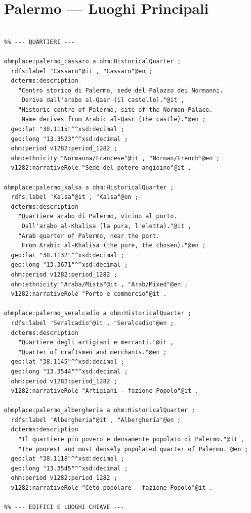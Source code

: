 \section{Palermo — Luoghi Principali}

\begin{verbatim}

%% --- QUARTIERI ---

ohmplace:palermo_cassaro a ohm:HistoricalQuarter ;
  rdfs:label "Cassaro"@it , "Cassaro"@en ;
  dcterms:description
    "Centro storico di Palermo, sede del Palazzo dei Normanni.
     Deriva dall'arabo al-Qasr (il castello)."@it ,
    "Historic centre of Palermo, site of the Norman Palace.
     Name derives from Arabic al-Qasr (the castle)."@en ;
  geo:lat "38.1115"^^xsd:decimal ;
  geo:long "13.3523"^^xsd:decimal ;
  ohm:period v1282:period_1282 ;
  ohm:ethnicity "Normanna/Francese"@it , "Norman/French"@en ;
  v1282:narrativeRole "Sede del potere angioino"@it .

ohmplace:palermo_kalsa a ohm:HistoricalQuarter ;
  rdfs:label "Kalsa"@it , "Kalsa"@en ;
  dcterms:description
    "Quartiere arabo di Palermo, vicino al porto.
     Dall'arabo al-Khalisa (la pura, l'eletta)."@it ,
    "Arab quarter of Palermo, near the port.
     From Arabic al-Khalisa (the pure, the chosen)."@en ;
  geo:lat "38.1132"^^xsd:decimal ;
  geo:long "13.3671"^^xsd:decimal ;
  ohm:period v1282:period_1282 ;
  ohm:ethnicity "Araba/Mista"@it , "Arab/Mixed"@en ;
  v1282:narrativeRole "Porto e commercio"@it .

ohmplace:palermo_seralcadio a ohm:HistoricalQuarter ;
  rdfs:label "Seralcadio"@it , "Seralcadio"@en ;
  dcterms:description
    "Quartiere degli artigiani e mercanti."@it ,
    "Quarter of craftsmen and merchants."@en ;
  geo:lat "38.1145"^^xsd:decimal ;
  geo:long "13.3544"^^xsd:decimal ;
  ohm:period v1282:period_1282 ;
  v1282:narrativeRole "Artigiani — fazione Popolo"@it .

ohmplace:palermo_albergheria a ohm:HistoricalQuarter ;
  rdfs:label "Albergheria"@it , "Albergheria"@en ;
  dcterms:description
    "Il quartiere più povero e densamente popolato di Palermo."@it ,
    "The poorest and most densely populated quarter of Palermo."@en ;
  geo:lat "38.1118"^^xsd:decimal ;
  geo:long "13.3545"^^xsd:decimal ;
  ohm:period v1282:period_1282 ;
  v1282:narrativeRole "Ceto popolare — fazione Popolo"@it .

%% --- EDIFICI E LUOGHI CHIAVE ---


\end{verbatim}

